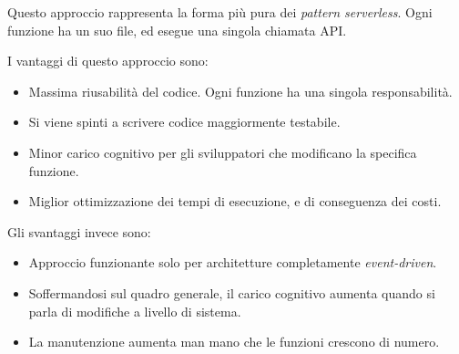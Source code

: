 Questo approccio rappresenta la forma più pura dei \textit{pattern serverless}. Ogni funzione ha un suo file, ed esegue una singola chiamata API.

I vantaggi di questo approccio sono:
\begin{itemize}
    \item Massima riusabilità del codice. Ogni funzione ha una singola responsabilità.
    \item Si viene spinti a scrivere codice maggiormente testabile.
    \item Minor carico cognitivo per gli sviluppatori che modificano la specifica funzione.
    \item Miglior ottimizzazione dei tempi di esecuzione, e di conseguenza dei costi.
\end{itemize}

Gli svantaggi invece sono:
\begin{itemize}
    \item Approccio funzionante solo per architetture completamente \textit{event-driven}.
    \item Soffermandosi sul quadro generale, il carico cognitivo aumenta quando si parla di modifiche a livello di sistema.
    \item La manutenzione aumenta man mano che le funzioni crescono di numero.
\end{itemize}